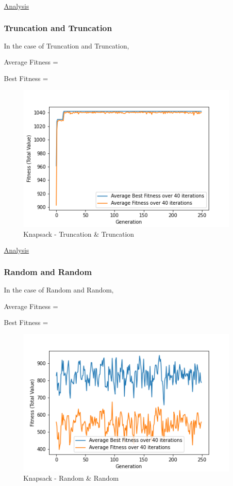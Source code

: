 \documentclass[11pt, letterpaper]{article}
\begin{document}
\underline{Analysis}

\subsubsection {Truncation and Truncation}
In the case of Truncation and Truncation,

Average Fitness = 

Best Fitness = 
\begin{figure}[H]
    \centering
    \includegraphics[scale = 0.6]{images/knapsack_tr_tr.png}
    \caption {Knapsack - Truncation \& Truncation}
    \label {fig:kpTT}
\end{figure}

\underline{Analysis}
\subsubsection {Random and Random}
In the case of Random and Random,

Average Fitness = 

Best Fitness = 
\begin{figure}[H]
    \centering
    \includegraphics[scale = 0.6]{images/knapsack_rd_rd.png}
    \caption {Knapsack - Random \& Random}
    \label {fig:kpRR}
\end{figure}
\end{document}
